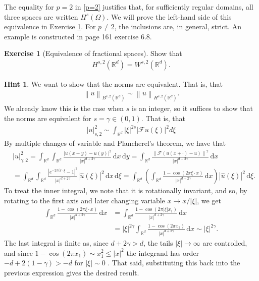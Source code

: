 \documentclass[
    a4paper,
    DIV=14,
    abstract=true,
    numbers=noenddot
]
{scrartcl}
\theoremstyle{definition}
\newtheorem{exercise}{Exercise}
\newtheorem*{hint}{Hint}
\newcommand{\wh}[1]{\widehat{#1}}
\renewcommand{\norm}[1]{\left\lVert #1 \right\rVert}\renewcommand{\abs}[1]{\left| #1 \right|}
\renewcommand{\d}{\,\mathrm{d}}\newcommand{\dx}{\,\mathrm{d}x}
\newcommand{\R}{\mathbb{R}}
\newcommand{\Ff}{\mathcal{F}}
\begin{document}
The equality for $p=2$ in \eqref{p=2} justifies that, for sufficiently regular domains, all three spaces are written $H^s(\Omega )$.   We will prove the left-hand side of this equivalence in Exercise \ref{equivalence of fractional spaces}. For $p\neq 2$, the inclusions are, in general, strict. An example is constructed in \cite{stein1970singular} page 161 exercise 6.8.
\begin{exercise}[Equivalence of fractional spaces]\label{equivalence of fractional spaces}
  Show that
  \begin{align*}
    H^{s,2}(\R^d)=W^{s,2}(\R^d).
  \end{align*}
\end{exercise}
\begin{hint}
  We want to show that the norms are equivalent. That is, that
  \begin{align*}
    \norm{u}_{B^{s,2}(\R^d)}\sim \norm{u}_{H^{s,2}(\R^d)}.
  \end{align*}
  We already know this is the case when $s$ is an integer, so it suffices to show that the norms are equivalent for $s= \gamma  \in (0,1)$. That is, that
  \begin{align*}
    |u|_{s,2}^2\sim \int_{\mathbb{R}^d}|\xi|^{2 s}|\mathcal{F} u(\xi)|^2 d \xi
  \end{align*}
  By multiple changes of variable and Plancherel's theorem, we have that
  \begin{align*}
     & |u|_{\gamma ,2}^2  =\int_{\R^d}\int_{\R^d}\frac{\abs{u(x+y)-u(y)}^2}{\abs{x}^{d+2\gamma	}}\d x \d y                                                                                                       = \int_{\R^d}\frac{\norm{\Ff (u(x+\cdot )-u)}^2}{\abs{x}^{d+2\gamma	}}\d x \\
     & =\int_{\R^d}\int_{\R^d}  \frac{|e^{-2 \pi i x \cdot \xi}-1|^2}{\abs{x}^{d+2\gamma	}}|\wh{u}(\xi)|^2\d x\d\xi =\int_{\R^d}\left(\int_{\R^d}  \frac{1-\cos(2\pi \xi\cdot x)}{\abs{x}^{d+2\gamma	}}\d x\right)|\wh{u}(\xi)|^2\d\xi.
  \end{align*}
  To treat the inner integral, we note that it is rotationally invariant, and so, by rotating to the first axis and later changing variable $x \to x / \abs{\xi}$, we get
  \begin{align*}
    \int_{\R^d}  \frac{1-\cos(2\pi \xi\cdot x)}{\abs{x}^{d+2\gamma	}}\d x & =\int_{\R^d}  \frac{1-\cos(2\pi \abs{\xi}x_1 )}{\abs{x}^{d+2\gamma	}}\d x                                          \\
                                                                          & =\abs{\xi}^{2 \gamma } \int_{\R^d}  \frac{1-\cos(2\pi  x_1) }{\abs{x}^{d+2\gamma	}}\d x\sim \abs{\xi}^{2 \gamma }.
  \end{align*}
  The last integral is finite as, since $d+2\gamma >d$, the tails $\abs{\xi}\to\infty$ are controlled, and since $1-\cos(2\pi x_1)\sim x_1^2\leq \abs{x}^2$ the integrand has order $-d+2(1-\gamma)>-d$ for $\abs{\xi}\sim 0$ . That said, substituting this back into the previous expression gives the desired result.
\end{hint}
\end{document}
